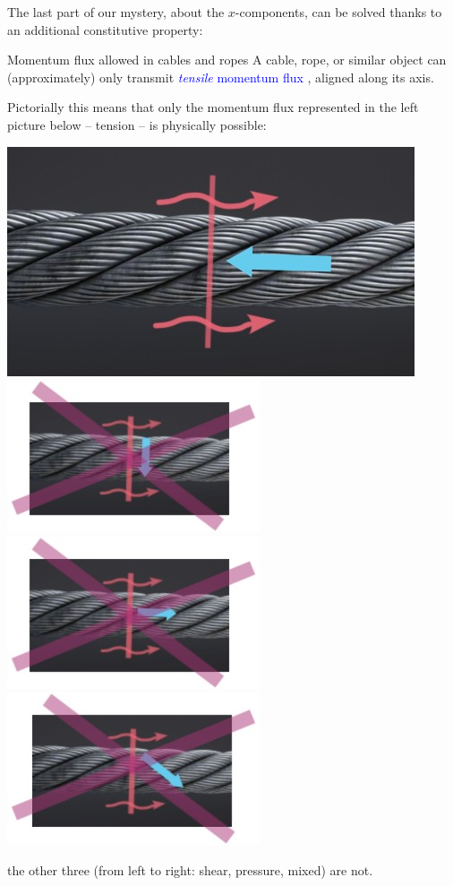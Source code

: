 \documentclass[a4paper,12pt,%
onecolumn,oneside,%
british%
]{memoir}
\renewcommand*{\|}[1][]{\nonscript\:#1\vert\nonscript\:\mathopen{}}
\newcommand*{\sect}{\S}%
\renewcommand*{\autoref}[3][\sect\,\ref]{\textcolor{blue}{#3}
\raisebox{0.6ex}{\color{blue}\miniscule%
\faIcon{angle-right}%
\;#1{#2}\;p.\,\pageref{#2}}}
\begin{document}
The last part of our mystery, about the $x$-components, can be solved thanks to an additional constitutive property:
\begin{definition}{{Momentum flux allowed in cables and ropes}}
  A cable, rope, or similar object can (approximately) only transmit \autoref{sec:tension}{\emph{tensile} momentum flux}, aligned along its axis.
\end{definition}
Pictorially this means that only the momentum flux represented in the left picture below -- tension -- is physically possible:
\begin{center}
\includegraphics[align=c,width=0.33\linewidth]{images/cabletension.jpg}%
\hfill
\includegraphics[align=c,width=0.22\linewidth]{images/cableshear.jpg}%
\includegraphics[align=c,width=0.22\linewidth]{images/cablepressure.jpg}%
\includegraphics[align=c,width=0.22\linewidth]{images/cablemix.jpg}%
\end{center}
the other three (from left to right: shear, pressure, mixed) are not.
\end{document}
